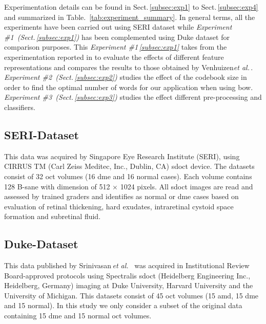 Experimentation details can be found in Sect.\,\ref{subsec:exp1} to Sect.\,\ref{subsec:exp4} and summarized in Table.~\ref{tab:experiment_summary}.
In general terms, all the experiments have been carried out using SERI dataset while \emph{Experiment \#1~(Sect.\,\ref{subsec:exp1})} has been complemented using Duke dataset for comparison purposes. This \emph{Experiment \#1\,\cref{subsec:exp1}} takes from the experimentation reported in \cite{Lemaintre2015miccaiOCT} to evaluate the effects of different feature representations and compares the results to those obtained by Venhuizen\emph{et al.}\,\cite{Venhuizen2015}.
\emph{Experiment \#2~(Sect.\,\ref{subsec:exp2})} studies the effect of the codebook size in order to find the optimal number of words for our application when using \ac{bow}.
\emph{Experiment \#3~(Sect.\,\ref{subsec:exp3})} studies the effect different pre-processing and classifiers.






\subsection{SERI-Dataset}\label{sec:exp:dataset:seri}
This data was acquired by Singapore Eye Research Institute (SERI), using CIRRUS TM (Carl Zeiss Meditec, Inc., Dublin, CA) \ac{sdoct} device. The datasets consist of 32 \ac{oct} volumes (16 \ac{dme} and 16 normal cases). Each volume contains 128 B-sane with  dimension of 512 $\times$ 1024 pixels.  All \ac{sdoct} images are read and assessed by trained graders and identifies as normal or \ac{dme} cases based on evaluation of retinal thickening, hard exudates, intraretinal cystoid space formation and subretinal fluid.

\subsection{Duke-Dataset} \label{sec:exp:dataset:duke}
This data published by Srinivasan\,\emph{et al.}~\cite{Srinivasan2014} was acquired in Institutional Review Board-approved protocols using Spectralis \ac{sdoct} (Heidelberg Engineering Inc., Heidelberg, Germany) imaging at Duke University, Harvard University and the University of Michigan. This datasets consist of 45 \ac{oct} volumes (15 \ac{amd}, 15 \ac{dme} and 15 normal). In this study we only consider a subset of the original data containing 15 \ac{dme} and 15 normal \ac{oct} volumes.


